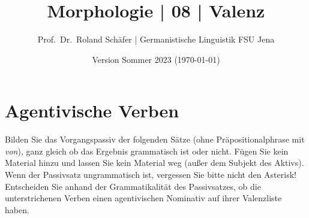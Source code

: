 \documentclass[12pt,a4paper,twoside]{article}
\author{Prof.\ Dr.\ Roland Schäfer | Germanistische Linguistik FSU Jena}
\title{Morphologie | 08 | Valenz}
\date{Version Sommer 2023 (\today)}
\newcommand{\Zeile}{\vspace{\baselineskip}}
\begin{document}
\maketitle

\Zeile

\section{Agentivische Verben}

Bilden Sie das Vorgangspassiv der folgenden Sätze (ohne Präpositionalphrase mit \textit{von}), ganz gleich ob das Ergebnis grammatisch ist oder nicht.
Fügen Sie kein Material hinzu und lassen Sie kein Material weg (außer dem Subjekt des Aktivs).
Wenn der Passivsatz ungrammatisch ist, vergessen Sie bitte nicht den Asterisk!
Entscheiden Sie anhand der Grammatikalität des Passivsatzes, ob die unterstrichenen Verben einen agentivischen Nominativ auf ihrer Valenzliste haben.

\Zeile
\end{document}
